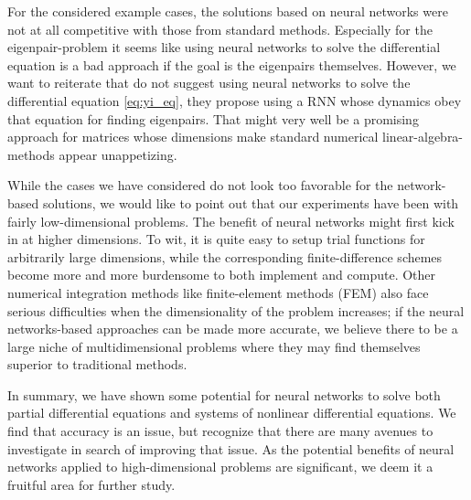 \documentclass[reprint, english, nofootinbib]{revtex4-2}
\begin{document}
For the considered example cases, the solutions based on neural networks were not at all competitive with those from standard methods. Especially for the  eigenpair-problem it seems like using neural networks to solve the differential equation is a bad approach if the goal is the eigenpairs themselves. However, we want to reiterate that \cite{Yi_2004} do not suggest using neural networks to solve the differential equation \ref{eq:yi_eq}, they propose using a RNN whose dynamics obey that equation for finding eigenpairs. That might very well be a promising approach for matrices whose dimensions make standard numerical linear-algebra-methods appear unappetizing.

While the cases we have considered do not look too favorable for the network-based solutions, we would like to point out that our experiments have been with fairly low-dimensional problems. The benefit of neural networks might first kick in at higher dimensions. To wit, it is quite easy to setup trial functions for arbitrarily large dimensions, while the corresponding finite-difference schemes become more and more burdensome to both implement and compute. Other numerical integration methods like finite-element methods (FEM) also face serious difficulties when the dimensionality of the problem increases; if the neural networks-based approaches can be made more accurate, we believe there to be a large niche of multidimensional problems where they may find themselves superior to traditional methods.

In summary, we have shown some potential for neural networks to solve both partial differential equations and systems of nonlinear differential equations. We find that accuracy is an issue, but recognize that there are many avenues to investigate in search of improving that issue. As the potential benefits of neural networks applied to high-dimensional problems are significant, we deem it a fruitful area for further study.

\onecolumngrid

\twocolumngrid
\end{document}
